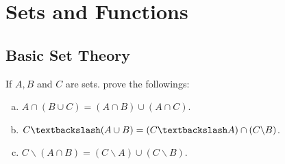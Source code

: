 \section{Sets and Functions}

\subsection{Basic Set Theory}

\begin{question} 
	If $A, B$ and $C$ are sets. prove the followings:
	\begin{enumerate}[(a)]
		\item $A \cap (B \cup C) = (A \cap B) \cup (A \cap C)$. \label{section-a}
		\item $C \textbackslash (A \cup B) = (C \textbackslash A) \cap (C \backslash B)$.
		\item $C \backslash (A \cap B) = (C \backslash A) \cup (C \backslash B) $.
	\end{enumerate}
\end{question}
